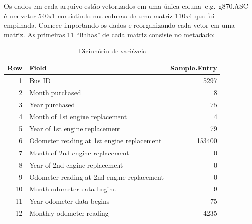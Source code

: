 \documentclass[12pt,a4paper]{article}
\newenvironment{Shaded}{\begin{snugshade}}{\end{snugshade}}
\newcommand{\CommentTok}[1]{\textcolor[rgb]{0.56,0.35,0.01}{\textit{#1}}}
\newcommand{\DataTypeTok}[1]{\textcolor[rgb]{0.13,0.29,0.53}{#1}}
\newcommand{\DecValTok}[1]{\textcolor[rgb]{0.00,0.00,0.81}{#1}}
\newcommand{\KeywordTok}[1]{\textcolor[rgb]{0.13,0.29,0.53}{\textbf{#1}}}
\newcommand{\NormalTok}[1]{#1}
\newcommand{\OperatorTok}[1]{\textcolor[rgb]{0.81,0.36,0.00}{\textbf{#1}}}
\newcommand{\OtherTok}[1]{\textcolor[rgb]{0.56,0.35,0.01}{#1}}
\newcommand{\StringTok}[1]{\textcolor[rgb]{0.31,0.60,0.02}{#1}}
\begin{document}
Os dados em cada arquivo estão vetorizados em uma única coluna:
e.g.~g870.ASC é um vetor 540x1 consistindo nas colunas de uma matriz
110x4 que foi empilhada. Comece importando os dados e reorganizando cada
vetor em uma matriz. As primeiras 11 ``linhas'' de cada matriz consiste
no metadado:

\begin{Shaded}
\end{Shaded}

\begin{table}[ht]
\centering
\begin{tabular}{rlr}
  \hline
Row & Field & Sample.Entry \\ 
  \hline
1 & Bus ID & 5297 \\ 
  2 & Month purchased & 8 \\ 
  3 & Year purchased & 75 \\ 
  4 & Month of 1st engine replacement & 4 \\ 
  5 & Year of 1st engine replacement & 79 \\ 
  6 & Odometer reading at 1st engine replacement & 153400 \\ 
  7 & Month of 2nd engine replacement & 0 \\ 
  8 & Year of 2nd engine replacement & 0 \\ 
  9 & Odometer reading at 2nd engine replacement & 0 \\ 
  10 & Month odometer data begins & 9 \\ 
  11 & Year odometer data begins & 75 \\ 
  12 & Monthly odometer reading & 4235 \\ 
   \hline
\end{tabular}
\caption{Dicionário de variáveis} 
\end{table}
\end{document}
